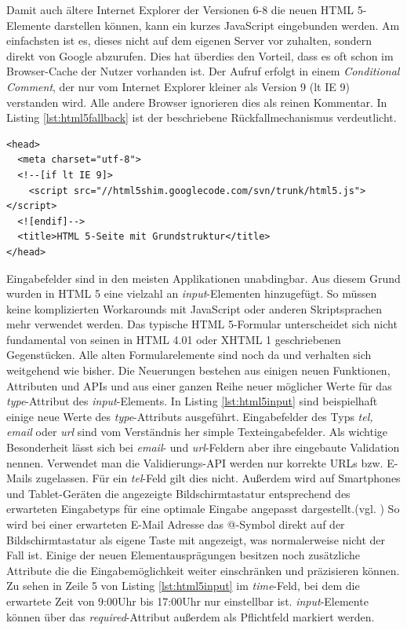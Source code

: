 \glqq Damit auch ältere Internet Explorer der Versionen 6-8 die neuen HTML 5-Elemente darstellen können, kann ein kurzes JavaScript eingebunden werden. Am einfachsten ist es, dieses nicht auf dem eigenen Server vor zuhalten, sondern direkt von Google abzurufen. Dies hat überdies den Vorteil, dass es oft schon im Browser-Cache der Nutzer vorhanden ist. Der Aufruf erfolgt in einem \textit{Conditional Comment}, der nur vom Internet Explorer kleiner als Version 9 (lt IE 9) verstanden wird. Alle andere Browser ignorieren dies als reinen Kommentar.\grqq{}\cite{SelfHtml20143} In Listing \ref{lst:html5fallback}	 ist der beschriebene Rückfallmechanismus verdeutlicht.

    \vspace{1em}
    \lstset{language=html}
	\begin{lstlisting}[frame=htrbl, caption=HTML 5 Internet Explorer Fallback, label=lst:html5fallback]
<head>
  <meta charset="utf-8">
  <!--[if lt IE 9]>
    <script src="//html5shim.googlecode.com/svn/trunk/html5.js"></script>
  <![endif]-->
  <title>HTML 5-Seite mit Grundstruktur</title>
</head>
	\end{lstlisting}
	
Eingabefelder sind in den meisten Applikationen unabdingbar. Aus diesem Grund wurden in HTML 5 eine vielzahl an \textit{input}-Elementen hinzugefügt. So müssen keine komplizierten Workarounds mit JavaScript oder anderen Skriptsprachen mehr verwendet werden. \glqq Das typische HTML 5-Formular unterscheidet sich nicht fundamental von seinen in HTML 4.01 oder XHTML 1 geschriebenen Gegenstücken. Alle alten Formularelemente sind noch da und verhalten sich weitgehend wie bisher. Die Neuerungen bestehen aus einigen neuen Funktionen, Attributen und APIs und aus einer ganzen Reihe neuer möglicher Werte für das \textit{type}-Attribut des \textit{input}-Elements.\grqq{}\cite[S.176]{KronHTML2011} In Listing \ref{lst:html5input} sind beispielhaft einige neue Werte des \textit{type}-Attributs ausgeführt. Eingabefelder des Typs \textit{tel, email} oder \textit{url} sind vom Verständnis her simple Texteingabefelder. Als wichtige Besonderheit lässt sich bei \textit{email}- und \textit{url}-Feldern aber ihre eingebaute Validation nennen. Verwendet man die Validierungs-API werden nur korrekte URLs bzw. E-Mails zugelassen. Für ein \textit{tel}-Feld gilt dies nicht. Außerdem wird auf Smartphones und Tablet-Geräten die angezeigte Bildschirmtastatur entsprechend des erwarteten Eingabetyps für eine optimale Eingabe angepasst dargestellt.(vgl. \cite[S.178]{KronHTML2011}) So wird bei einer erwarteten E-Mail Adresse das @-Symbol direkt auf der Bildschirmtastatur als eigene Taste mit angezeigt, was normalerweise nicht der Fall ist. Einige der neuen Elementausprägungen besitzen noch zusätzliche Attribute die die Eingabemöglichkeit weiter einschränken und präzisieren können. Zu sehen in Zeile 5 von Listing \ref{lst:html5input} im \textit{time}-Feld, bei dem die erwartete Zeit von 9:00Uhr bis 17:00Uhr nur einstellbar ist. \textit{input}-Elemente können über das \textit{required}-Attribut außerdem als Pflichtfeld markiert werden.

